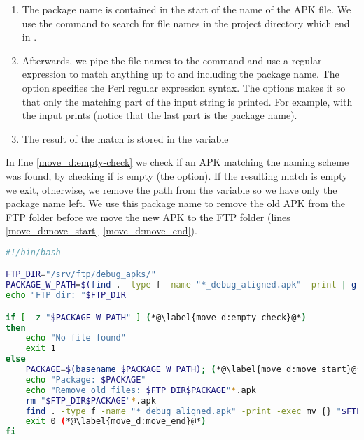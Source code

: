 \begin{enumerate}
  \item The package name is contained in the start of the name of the APK file. We use the  command to search for file names in the project directory which end in .
  \item Afterwards, we pipe the file names to the  command and use a regular expression to match anything up to and including the package name. The  option specifies the Perl regular expression syntax. The  options makes it so that only the matching part of the input string is printed. For example,  with the input  prints  (notice that the last part is the package name).
  \item The result of the match is stored in the variable 
\end{enumerate}

In line \ref{move_d:empty-check} we check if an APK matching the naming scheme was found, by checking if  is empty (the  option). If the resulting match is empty we exit, otherwise, we remove the path from the variable  so we have only the package name left. We use this package name to remove the old APK from the FTP folder before we move the new APK to the FTP folder (lines \ref{move_d:move_start}--\ref{move_d:move_end}).

\begin{lstlisting}[language=bash,showstringspaces=false,caption=Script that moves the debug APK to the ftp server,label=lst:move_debug_apk]
#!/bin/bash

FTP_DIR="/srv/ftp/debug_apks/"
PACKAGE_W_PATH=$(find . -type f -name "*_debug_aligned.apk" -print | grep ".+(?=_v.+b[0-9]+_debug_aligned\.apk)" -Po) (*@\label{move_d:package}@*)
echo "FTP dir: "$FTP_DIR

if [ -z "$PACKAGE_W_PATH" ] (*@\label{move_d:empty-check}@*)
then
    echo "No file found"
    exit 1
else
    PACKAGE=$(basename $PACKAGE_W_PATH); (*@\label{move_d:move_start}@*)
    echo "Package: $PACKAGE"
    echo "Remove old files: $FTP_DIR$PACKAGE"*.apk
    rm "$FTP_DIR$PACKAGE"*.apk
    find . -type f -name "*_debug_aligned.apk" -print -exec mv {} "$FTP_DIR" \;
    exit 0 (*@\label{move_d:move_end}@*)
fi
\end{lstlisting}

